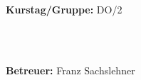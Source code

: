 \documentclass[12pt,a4paper]{article}
\begin{document}
\begin{verbatim}


\end{verbatim}
			\begin{flushleft}
			\textbf{\Large{Kurstag/Gruppe:}} \Large{DO/2}
			\end{flushleft}

\begin{verbatim}



\end{verbatim}
			\begin{flushleft}
			\LARGE{\textbf{Betreuer:}}	\Large{ Franz Sachslehner }	
			\end{flushleft}
\end{document}
